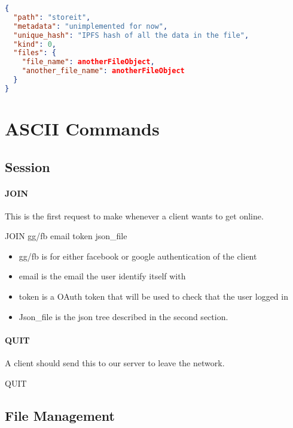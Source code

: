\documentclass{article}
\begin{document}
\begin{lstlisting}[language=json,firstnumber=1]
{
  "path": "storeit",
  "metadata": "unimplemented for now",
  "unique_hash": "IPFS hash of all the data in the file",
  "kind": 0,
  "files": {
    "file_name": anotherFileObject,
    "another_file_name": anotherFileObject
  }
}
\end{lstlisting}

\section{ASCII Commands}

\subsection{Session}

\paragraph{JOIN}

This is the first request to make whenever a client wants to get online.\\
\begin{center}JOIN gg/fb email token json\_file\end{center}

  \begin{itemize}
    \item gg/fb is for either facebook or google authentication of the client
    \item email is the email the user identify itself with
    \item token is a OAuth token that will be used to check that the user logged in
    \item Json\_file is the json tree described in the second section.
  \end{itemize}

\paragraph{QUIT}

A client should send this to our server to leave the network.\\

\begin{center}QUIT\end{center}

\subsection{File Management}
\end{document}
